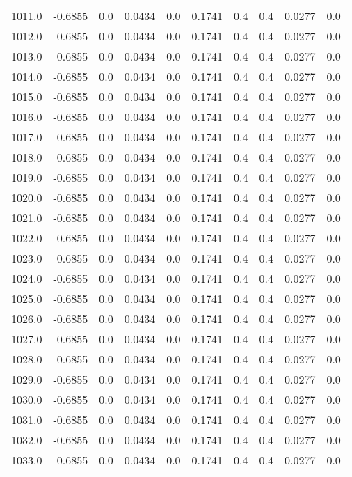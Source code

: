 \begin{longtable}{lrrrrrrrrr}
1011.0 & -0.6855 & 0.0 & 0.0434 & 0.0 & 0.1741 & 0.4 & 0.4 & 0.0277 & 0.0 \\
1012.0 & -0.6855 & 0.0 & 0.0434 & 0.0 & 0.1741 & 0.4 & 0.4 & 0.0277 & 0.0 \\
1013.0 & -0.6855 & 0.0 & 0.0434 & 0.0 & 0.1741 & 0.4 & 0.4 & 0.0277 & 0.0 \\
1014.0 & -0.6855 & 0.0 & 0.0434 & 0.0 & 0.1741 & 0.4 & 0.4 & 0.0277 & 0.0 \\
1015.0 & -0.6855 & 0.0 & 0.0434 & 0.0 & 0.1741 & 0.4 & 0.4 & 0.0277 & 0.0 \\
1016.0 & -0.6855 & 0.0 & 0.0434 & 0.0 & 0.1741 & 0.4 & 0.4 & 0.0277 & 0.0 \\
1017.0 & -0.6855 & 0.0 & 0.0434 & 0.0 & 0.1741 & 0.4 & 0.4 & 0.0277 & 0.0 \\
1018.0 & -0.6855 & 0.0 & 0.0434 & 0.0 & 0.1741 & 0.4 & 0.4 & 0.0277 & 0.0 \\
1019.0 & -0.6855 & 0.0 & 0.0434 & 0.0 & 0.1741 & 0.4 & 0.4 & 0.0277 & 0.0 \\
1020.0 & -0.6855 & 0.0 & 0.0434 & 0.0 & 0.1741 & 0.4 & 0.4 & 0.0277 & 0.0 \\
1021.0 & -0.6855 & 0.0 & 0.0434 & 0.0 & 0.1741 & 0.4 & 0.4 & 0.0277 & 0.0 \\
1022.0 & -0.6855 & 0.0 & 0.0434 & 0.0 & 0.1741 & 0.4 & 0.4 & 0.0277 & 0.0 \\
1023.0 & -0.6855 & 0.0 & 0.0434 & 0.0 & 0.1741 & 0.4 & 0.4 & 0.0277 & 0.0 \\
1024.0 & -0.6855 & 0.0 & 0.0434 & 0.0 & 0.1741 & 0.4 & 0.4 & 0.0277 & 0.0 \\
1025.0 & -0.6855 & 0.0 & 0.0434 & 0.0 & 0.1741 & 0.4 & 0.4 & 0.0277 & 0.0 \\
1026.0 & -0.6855 & 0.0 & 0.0434 & 0.0 & 0.1741 & 0.4 & 0.4 & 0.0277 & 0.0 \\
1027.0 & -0.6855 & 0.0 & 0.0434 & 0.0 & 0.1741 & 0.4 & 0.4 & 0.0277 & 0.0 \\
1028.0 & -0.6855 & 0.0 & 0.0434 & 0.0 & 0.1741 & 0.4 & 0.4 & 0.0277 & 0.0 \\
1029.0 & -0.6855 & 0.0 & 0.0434 & 0.0 & 0.1741 & 0.4 & 0.4 & 0.0277 & 0.0 \\
1030.0 & -0.6855 & 0.0 & 0.0434 & 0.0 & 0.1741 & 0.4 & 0.4 & 0.0277 & 0.0 \\
1031.0 & -0.6855 & 0.0 & 0.0434 & 0.0 & 0.1741 & 0.4 & 0.4 & 0.0277 & 0.0 \\
1032.0 & -0.6855 & 0.0 & 0.0434 & 0.0 & 0.1741 & 0.4 & 0.4 & 0.0277 & 0.0 \\
1033.0 & -0.6855 & 0.0 & 0.0434 & 0.0 & 0.1741 & 0.4 & 0.4 & 0.0277 & 0.0 \\

\end{longtable}

